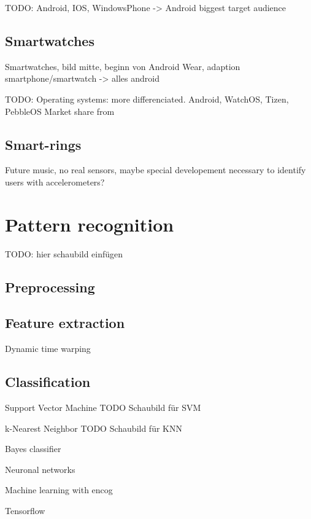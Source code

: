 TODO: Android, IOS, WindowsPhone -> Android biggest target audience
\subsection{Smartwatches}
Smartwatches, bild mitte, beginn von Android Wear, adaption smartphone/smartwatch -> alles android

TODO: Operating systems: more differenciated. Android, WatchOS, Tizen, PebbleOS Market share from \cite{idc2015wristmarketshare}

\subsection{Smart-rings}
Future music, no real sensors, maybe special developement necessary to identify users with accelerometers?

\section{Pattern recognition}
TODO: hier schaubild einfügen
\subsection{Preprocessing}
\subsection{Feature extraction}
Dynamic time warping
\subsection{Classification}
Support Vector Machine
TODO Schaubild für SVM

k-Nearest Neighbor
TODO Schaubild für KNN

Bayes classifier

Neuronal networks

Machine learning with encog

Tensorflow